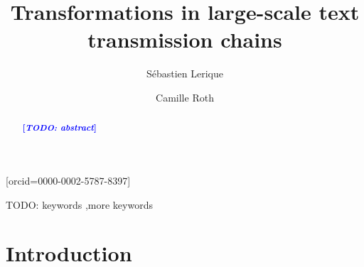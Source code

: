 \documentclass[a4paper,fleqn]{cas-dc}
\newcommand{\tb}[1]{\textcolor{blue}{#1}}
\newcommand{\rk}[1]{\tb{{\footnotesize {\bf[\emph{#1}]}}}}
\begin{document}
\def\textpagefraction{.001}

\title[mode=title]{Transformations in large-scale text transmission chains}

\author[1]{Sébastien Lerique}[orcid=0000-0002-5787-8397]
\cormark[1]
\address[1]{Embodied Cognitive Science Unit, Okinawa Institute of Science and Technology Graduate University, Onna-son, Okinawa 904-0495, Japan}

\author[2,3]{Camille Roth}
\address[2]{Camille's first affiliation}
\address[3]{Camille's second affiliation}


\begin{abstract}
  \rk{TODO: abstract}
\end{abstract}



\begin{keywords}
  TODO: keywords \sep more keywords
\end{keywords}

\maketitle




\section{Introduction}\label{sec:gistr-intro}
\end{document}
